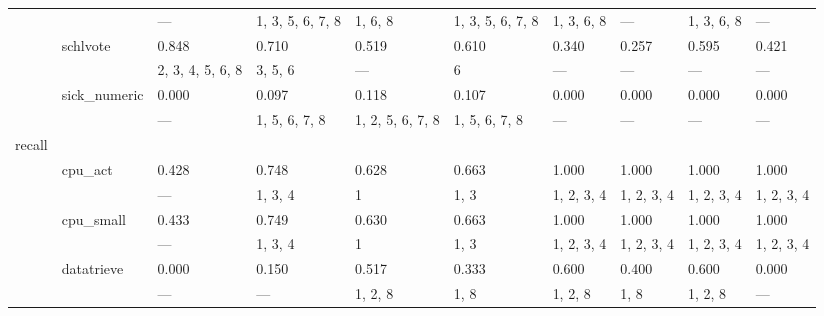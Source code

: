 \documentclass{article}
\begin{document}
\begin{center}
\begin{longtable}{p{1.2cm}p{1.8cm}p{1cm}p{1cm}p{1cm}p{1cm}p{1cm}p{1cm}p{1cm}p{1cm}}
             &              & ---              & 1, 3, 5, 6, 7, 8 & 1, 6, 8          & 1, 3, 5, 6, 7, 8 & 1, 3, 6, 8       & ---              & 1, 3, 6, 8       & ---              \\
             & schlvote     & 0.848            & 0.710            & 0.519            & 0.610            & 0.340            & 0.257            & 0.595            & 0.421            \\
             &              & 2, 3, 4, 5, 6, 8 & 3, 5, 6          & ---              & 6                & ---              & ---              & ---              & ---              \\
             & sick\_numeric & 0.000            & 0.097            & 0.118            & 0.107            & 0.000            & 0.000            & 0.000            & 0.000            \\
             &              & ---              & 1, 5, 6, 7, 8    & 1, 2, 5, 6, 7, 8 & 1, 5, 6, 7, 8    & ---              & ---              & ---              & ---              \\
 recall      &              &                  &                  &                  &                  &                  &                  &                  &                  \\
             & cpu\_act      & 0.428            & 0.748            & 0.628            & 0.663            & 1.000            & 1.000            & 1.000            & 1.000            \\
             &              & ---              & 1, 3, 4          & 1                & 1, 3             & 1, 2, 3, 4       & 1, 2, 3, 4       & 1, 2, 3, 4       & 1, 2, 3, 4       \\
             & cpu\_small    & 0.433            & 0.749            & 0.630            & 0.663            & 1.000            & 1.000            & 1.000            & 1.000            \\
             &              & ---              & 1, 3, 4          & 1                & 1, 3             & 1, 2, 3, 4       & 1, 2, 3, 4       & 1, 2, 3, 4       & 1, 2, 3, 4       \\
             & datatrieve   & 0.000            & 0.150            & 0.517            & 0.333            & 0.600            & 0.400            & 0.600            & 0.000            \\
             &              & ---              & ---              & 1, 2, 8          & 1, 8             & 1, 2, 8          & 1, 8             & 1, 2, 8          & ---              \\

\end{longtable}
\end{center}
\end{document}
